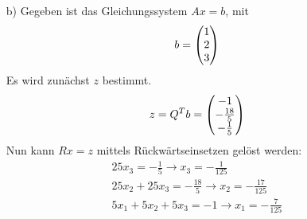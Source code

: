 \documentclass[11pt]{article}
\theoremstyle{plain}
\theoremstyle{definition}
\renewcommand{\a}{\"{a}}
\renewcommand{\o}{\"{o}}
\renewcommand{\u}{\"{u}}
\begin{document}
\begin{itemize}
Da der Eintrag $a'_{31}=0$ ist, k\o nnen wir diesen \u berspringen und den Eintrag $a'_{32}=-20$ Null setzen. Dazu wenden wir die Givens-Rotation $Q_{23}$ an.
Wir setzen $a=-15$ und $b=-20$ und berechnen $Q_{23}$ analog zu oben:
\begin{equation}
Q_{23} = 
\begin{pmatrix}1 & 0 & 0\cr 0 & -\frac{3}{5} & -\frac{4}{5}\cr 0 & \frac{4}{5} & -\frac{3}{5}\end{pmatrix}
\end{equation}
Anschliessend wird die Rotation auf $A'$ angewendet und ergibt:
\begin{equation}
R=Q_{23} A' = 
\begin{pmatrix}5 & 5 & 5\cr 0 & 25 & 25\cr 0 & 0 & 25\end{pmatrix}
\end{equation}
$Q$ l\a sst sich nun einfach folgendermassen berechnen:
\begin{equation}
Q = (Q_{23}Q_{12})^T = 
\begin{pmatrix}\frac{3}{5} & -\frac{12}{25} & \frac{16}{25}\cr -\frac{4}{5} & -\frac{9}{25} & \frac{12}{25}\cr 0 & -\frac{4}{5} & -\frac{3}{5}\end{pmatrix}
\end{equation}
Zur Probe wird $QR$ gerechnet:
\begin{equation}
QR = 
\begin{pmatrix}3 & -9 & 7\cr -4 & -13 & -1\cr 0 & -20 & -35\end{pmatrix}=\begin{pmatrix}3 & -9 & 7\cr -4 & -13 & -1\cr 0 & -20 & -35\end{pmatrix}
\end{equation}
Dies entspricht $A$ und somit ist die QR-Zerlegung richtig.


\item[b)]
Gegeben ist das Gleichungssystem $Ax=b$, mit 
\begin{equation}
b=
\begin{pmatrix}1\cr 2\cr 3\end{pmatrix}
\end{equation}
Es wird zun\a chst $z$ bestimmt.
\begin{equation}
z=Q^Tb = 
\begin{pmatrix}-1\cr -\frac{18}{5}\cr -\frac{1}{5}\end{pmatrix}
\end{equation}
Nun kann $Rx=z$ mittels R\u ckw\a rtseinsetzen gel\o st werden:
\begin{align*}
25 x_3 = -\frac{1}{5} \rightarrow x_3 = -\frac{1}{125} \\
25 x_2 + 25 x_3 = -\frac{18}{5} \rightarrow x_2 = -\frac{17}{125} \\
5 x_1 + 5 x_2 + 5 x_3 = -1 \rightarrow x_1 = -\frac{7}{125} \\
\end{align*}
\end{itemize}
\end{document}

